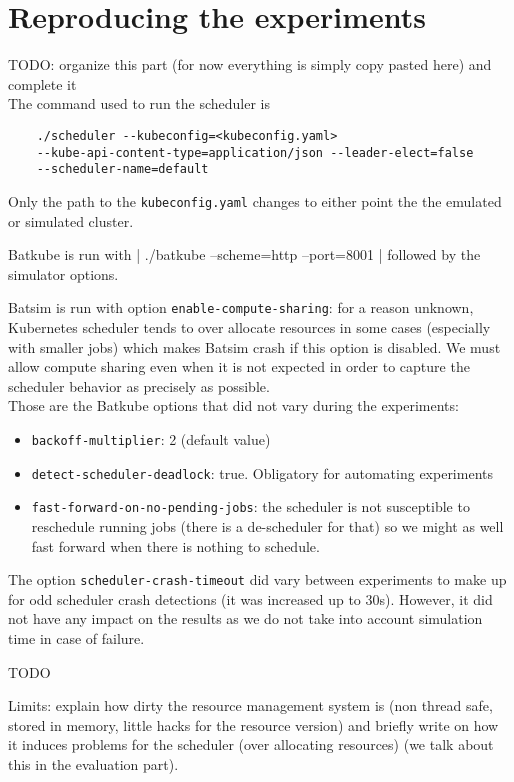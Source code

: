 \section{Reproducing the experiments}

TODO: organize this part (for now everything is simply copy pasted here) and complete it\\

The command used to run the scheduler is
\begin{verbatim}
	./scheduler --kubeconfig=<kubeconfig.yaml>
	--kube-api-content-type=application/json --leader-elect=false
	--scheduler-name=default
\end{verbatim}
\noindent Only the path to the \texttt{kubeconfig.yaml} changes to either point the the
emulated or simulated cluster.

Batkube is run with | ./batkube --scheme=http --port=8001 |
\noindent followed by the simulator options.

Batsim is run with option \texttt{enable-compute-sharing}: for a reason
unknown, Kubernetes scheduler tends to over allocate resources in some cases
(especially with smaller jobs) which makes Batsim crash if this option is
disabled. We must allow compute sharing even when it is not expected in order
to capture the scheduler behavior as precisely as possible.\\

Those are the Batkube options that did not vary during the experiments:
\begin{itemize}
	\item \texttt{backoff-multiplier}: 2 (default value)
	\item \texttt{detect-scheduler-deadlock}: true. Obligatory for
		automating experiments
	\item \texttt{fast-forward-on-no-pending-jobs}: the scheduler is not
		susceptible to reschedule running jobs (there is a de-scheduler
		for that) so we might as well fast forward when there is
		nothing to schedule.

\end{itemize}

The option \texttt{scheduler-crash-timeout} did vary between experiments to
make up for odd scheduler crash detections (it was increased up to 30s).
However, it did not have any impact on the results as we do not take into
account simulation time in case of failure.

TODO

Limits: explain how dirty the resource management system is (non
thread safe, stored in memory, little hacks for the resource version) and
briefly write on how it induces problems for the scheduler (over allocating
resources) (we talk about this in the evaluation part).
